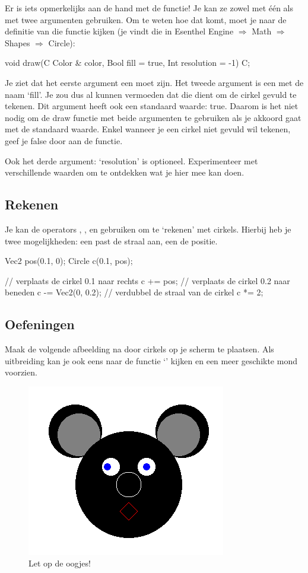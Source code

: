 Er is iets opmerkelijks aan de hand met de  functie! Je kan ze zowel met \'e\'en als met twee argumenten gebruiken. Om te weten hoe dat komt, moet je naar de definitie van die functie kijken (je vindt die in Esenthel Engine $\Rightarrow$ Math $\Rightarrow$ Shapes $\Rightarrow$ Circle):

\begin{code}
void draw(C Color & color, Bool fill = true, Int resolution = -1) C;
\end{code}

Je ziet dat het eerste argument een  moet zijn. Het tweede argument is een  met de naam `fill'. Je zou dus al kunnen vermoeden dat die dient om de cirkel gevuld te tekenen. Dit argument heeft ook een standaard waarde: true. Daarom is het niet nodig om de draw functie met beide argumenten te gebruiken als je akkoord gaat met de standaard waarde. Enkel wanneer je een cirkel niet gevuld wil tekenen, geef je false door aan de functie.


\begin{note}
Ook het derde argument: `resolution' is optioneel. Experimenteer met verschillende waarden om te ontdekken wat je hier mee kan doen.
\end{note}

\subsection{Rekenen}
Je kan de operators \eeOpp{+=}, \eeOpp{-=}, \eeOpp{/=} en \eeOpp{*=} gebruiken om te `rekenen' met cirkels. Hierbij heb je twee mogelijkheden: een  past de straal aan, een  de positie.

\begin{code}
Vec2 pos(0.1, 0);
Circle c(0.1, pos);

// verplaats de cirkel 0.1 naar rechts
c += pos;
// verplaats de cirkel 0.2 naar beneden
c -= Vec2(0, 0.2);
// verdubbel de straal van de cirkel
c *= 2;
\end{code}

\subsection{Oefeningen}
Maak de volgende afbeelding na door cirkels op je scherm te plaatsen. Als uitbreiding kan je ook eens naar de functie `' kijken en een meer geschikte mond voorzien.

\begin{figure}[h]
\centering
\includegraphics[width=0.4\linewidth]{../images/circle_exercise.png}
\caption[]{Let op de oogjes!}
\label{fig:pos2D}
\end{figure}

